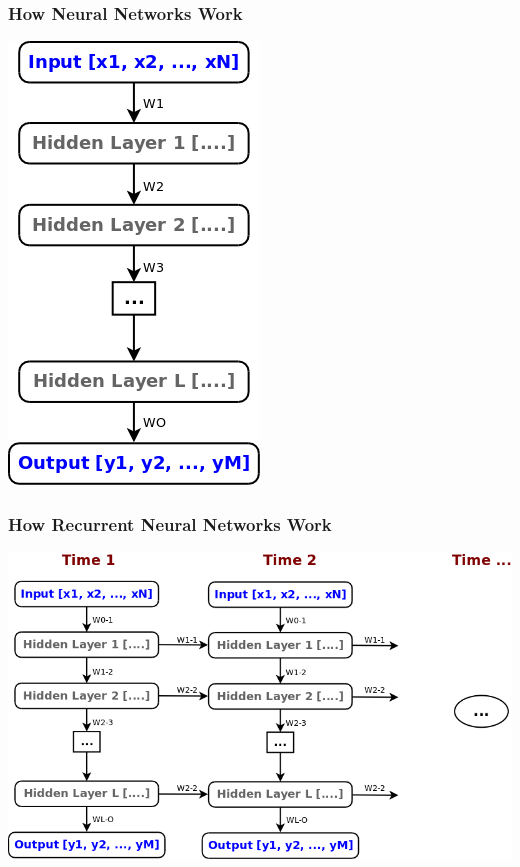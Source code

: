\documentclass[12]{beamer}
\begin{document}
\begin{frame}
\frametitle{How Neural Networks Work}
\begin{center}
\includegraphics[scale=0.25]{../images/network01.png}
\end{center}
\end{frame}

\begin{frame}
\frametitle{How Recurrent Neural Networks Work}
\begin{center}
\includegraphics[scale=0.25]{../images/network02.png}
\end{center}
\end{frame}
\end{document}
